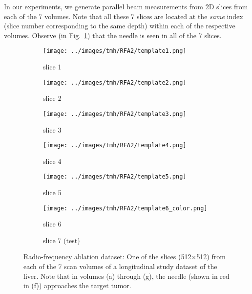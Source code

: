 \documentclass[journal]{IEEEtran}
\begin{document}
In our experiments, we generate parallel beam measurements from 2D
slices from each of the 7 volumes. Note that all these 7 slices are
located at the \emph{same} index (slice number corresponding to the
same depth) within each of the respective volumes.  Observe (in
Fig.~\ref{fig:RFA2_test_object-prior}) that the needle is seen in all
of the 7 slices.
\begin{figure}[h!]
    \begin{subfigure}[b]{0.24\linewidth}
        \texttt{[image: ../images/tmh/RFA2/template1.png]}
 \caption{slice 1}
    \end{subfigure}
    \begin{subfigure}[b]{0.24\linewidth}
        \texttt{[image: ../images/tmh/RFA2/template2.png]}
 \caption{slice 2}
    \end{subfigure}
     \begin{subfigure}[b]{0.24\linewidth}
        \texttt{[image: ../images/tmh/RFA2/template3.png]}
 \caption{slice 3}
    \end{subfigure}
       \begin{subfigure}[b]{0.24\linewidth}
        \texttt{[image: ../images/tmh/RFA2/template4.png]}
 \caption{slice 4}
    \end{subfigure}
       \begin{subfigure}[b]{0.24\linewidth}
        \texttt{[image: ../images/tmh/RFA2/template5.png]}
 \caption{slice 5}
    \end{subfigure}
              \begin{subfigure}[b]{0.24\linewidth}
        \texttt{[image: ../images/tmh/RFA2/template6\_color.png]}
 \caption{slice 6}
    \end{subfigure}
       \begin{subfigure}[b]{0.23\linewidth}
 \caption{slice 7 (test)}
    \end{subfigure}     
     \caption{Radio-frequency ablation dataset: One of the slices
       (512$\times$512) from each of the 7 scan volumes of a
       longitudinal study dataset of the liver. Note that in volumes
       (a) through (g), the needle (shown in red in (f)) approaches
       the target tumor.}
\label{fig:RFA2_test_object-prior}
\end{figure}
\end{document}
